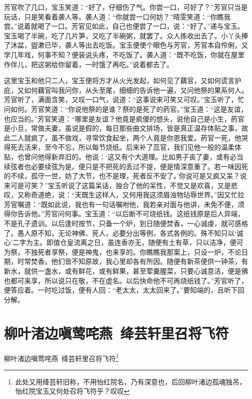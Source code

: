 \documentclass[12pt,oneside]{book}
\begin{document}
芳官吹了几口，宝玉笑道：“好了，仔细伤了气。你尝一口，可好了？”芳官只当是玩话，只是笑看着袭人等。袭人道：“你就尝一口何妨？”晴雯笑道：“你瞧我尝。”说着就喝了一口。芳官见如此，自己也便尝了一口，说：“好了。”递与宝玉。宝玉喝了半碗，吃了几片笋，又吃了半碗粥，就罢了。众人拣收出去了。小丫头捧了沐盆，盥漱已毕，袭人等出去吃饭。宝玉便使个眼色与芳官，芳官本自伶俐，又学几年戏，何事不知？便装说头疼，不吃饭了。袭人道：“既不吃饭，你就在屋里作伴儿，把这粥给你留着，一时饿了再吃。”说着都去了。

这里宝玉和他只二人，宝玉便将方才从火光发起，如何见了藕官，又如何谎言护庇，又如何藕官叫我问你，从头至尾，细细的告诉他一遍，又问他祭的果系何人。芳官听了，满面含笑，又叹一口气，说道：“这事说来可笑又可叹。”宝玉听了，忙问如何。芳官笑道：“你说他祭的是谁？祭的是死了的菂官。”宝玉道：“这是友谊，也应当的。”芳官笑道：“哪里是友谊？他竟是疯傻的想头，说他自己是小生，菂官是小旦，常做夫妻，虽说是假的，每日那些曲文排场，皆是真正温存体贴之事，故此二人就疯了，虽不做戏，寻常饮食起坐，两个人竟是你恩我爱。菂官一死，他哭得死去活来，至今不忘，所以每节烧纸。后来补了蕊官，我们见他一般的温柔体贴，也曾问他得新弃旧的。他说：‘这又有个大道理。比如男子丧了妻，或有必当续弦者也必要续弦为是。便只是不把死的丢过不提，便是情深意重了。若一味因死的不续，孤守一世，妨了大节，也不是理，死者反不安了。’你说可是又疯又呆？说来可是可笑？”宝玉听说了这篇呆话，独合了他的呆性，不觉又是欢喜，又是悲叹，又称奇道绝，说：“天既生这样人，又何用我这须眉浊物玷辱世界。”因又忙拉芳官嘱道：“既如此说，我也有一句话嘱咐他，我若亲对面与他讲，未免不便，须得你告诉他。”芳官问何事。宝玉道：“以后断不可烧纸钱。这纸钱原是后人异端，不是孔子遗训。以后逢时按节，只备一个炉，到日随便焚香，一心诚虔，就可感格了。愚人原不知，无论神佛、死人，必要分出等例，各式各例的。殊不知只以‘诚心’二字为主。即值仓皇流离之日，虽连香亦无，随便有土有草，只以洁净，便可为祭，不独死者享祭，便是神鬼，也来享的。你瞧瞧我那案上，只设一炉，不论日期，时常焚香。他们皆不知原故，我心里却各有所因。随便有新茶便供一钟茶，有新水，就供一盏水，或有鲜花，或有鲜果，甚至荤羹腥菜，只要心诚意洁，便是佛也都可来享，所以说只在敬，不在虚名。以后快命他不可再烧纸钱了。”芳官听了，便答应着。一时吃过饭，便有人回：“老太太，太太回来了。”要知端的，且听下回分解。



\chapter{柳叶渚边嗔莺咤燕~绛芸轩里召将飞符}
柳叶渚边嗔莺咤燕~绛芸轩里召将飞符\footnote{此处又用绛芸轩旧称，不用怡红院名，乃有深意也，后回柳叶渚边孤魂独吊，怡红院宝玉又何处召将飞符乎？叹叹}
\end{document}
